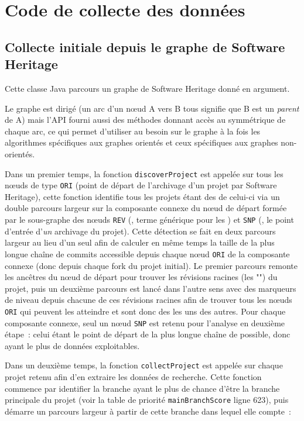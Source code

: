 \chapter{Code de collecte des données}

\section{Collecte initiale depuis le graphe de Software Heritage}
\label{sec:collect.java}

Cette classe Java parcours un graphe de Software Heritage donné en argument.

Le graphe est dirigé (un arc d'un nœud A vers B tous signifie que B est un  \emph{parent} de A)
mais l'API fourni aussi des méthodes donnant accès au symmétrique de chaque arc, ce qui permet d'utiliser au
besoin sur le graphe à la fois les algorithmes spécifiques aux graphes orientés et ceux spécifiques aux
graphes non-orientés.

Dans un premier temps, la fonction \texttt{discoverProject} est appelée sur tous les nœuds de type
\texttt{ORI} (point de départ de l'archivage d'un projet par Software Heritage), cette fonction identifie tous
les projets étant des  de celui-ci via un double parcours largeur sur la composante connexe du nœud
de départ formée par le sous-graphe des nœuds \texttt{REV} (, terme générique pour les
) et \texttt{SNP} (, le point d'entrée d'\emph{un} archivage du projet). Cette
détection se fait en deux parcours largeur au lieu d'un seul afin de calculer en même temps la taille de la
plus longue chaîne de commits accessible depuis chaque nœud \texttt{ORI} de la composante connexe (donc depuis
chaque fork du projet initial). Le premier parcours remonte les ancêtres du nœud de départ pour trouver les
révisions racines (les "") du projet, puis un deuxième parcours est lancé dans l'autre
sens avec des marqueurs de niveau depuis chacune de ces révisions racines afin de trouver tous les nœuds
\texttt{ORI} qui peuvent les atteindre et sont donc des  les uns des autres. Pour chaque composante
connexe, seul un nœud \texttt{SNP} est retenu pour l'analyse en deuxième étape : celui étant le point de
départ de la plus longue chaîne de  possible, donc ayant le plus de données exploitables.

Dans un deuxième temps, la fonction \texttt{collectProject} est appelée sur chaque projet retenu afin d'en
extraire les données de recherche. Cette fonction commence par identifier la branche ayant le plus de chance
d'être la branche principale du projet (voir la table de priorité \texttt{mainBranchScore} ligne 623), puis
démarre un parcours largeur à partir de cette branche dans lequel elle compte :

